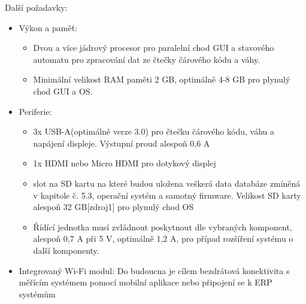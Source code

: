 Další požadavky:
\begin{itemize}
    \item Výkon a paměť: 
        \begin{itemize}
            \item Dvou a více jádrový procesor pro paralelní chod GUI a stavového automatu pro zpracování dat ze čtečky čárového kódu a váhy. 
            \item Minimální velikost RAM paměti 2 GB, optimálně 4-8 GB pro plynulý chod GUI a OS.
        \end{itemize}
    \item Periferie:
        \begin{itemize}
            \item 3x USB-A(optimálně verze 3.0) pro čtečku čárového kódu, váhu a napájení displeje. Výstupní proud alespoň 0,6 A 
            \item 1x HDMI nebo Micro HDMI pro dotykový displej
            \item slot na SD kartu na které budou uložena veškerá data databáze zmíněná v kapitole č. 5.3, operační systém a samotný firmware. Velikost SD karty alespoň 32 GB[zdroj1] pro plynulý chod OS  
            \item Řídící jednotka musí zvládnout poskytnout dle vybraných komponent, alespoň 0,7 A při 5 V, optimálně 1,2 A, pro případ rozšíření systému o další komponenty.
        \end{itemize}
    \item Integrovaný Wi-Fi modul: Do budoucna je cílem bezdrátová konektivita s měřícím systémem pomocí mobilní aplikace nebo připojení se k ERP systémům
\end{itemize}

